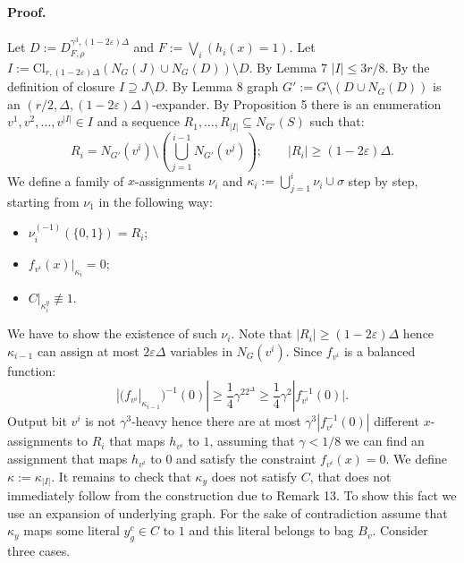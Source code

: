 \paragraph{Proof.} Let $D:=D_{F,\rho}^{\gamma^3,(1-2\varepsilon)\Delta}$ and $F:=\bigvee_i(h_i(x)=1)$. Let $I:=\mathrm{Cl}_{r,(1-2\varepsilon)\Delta}(N_G(J)\cup N_G(D))\setminus D$. By Lemma 7 $|I|\leq3r/8$. By the definition of closure $I\supseteq J\setminus D$.
By Lemma 8 graph $G':=G\setminus(D\cup N_G(D))$ is an $(r/2,\Delta,(1-2\varepsilon)\Delta)$-expander. By Proposition 5 there is an enumeration $v^1,v^2,\ldots,v^{|I|}\in I$ and a sequence $R_1,\ldots,R_{|I|}\subseteq N_{G'}(S)$ such that:
\[R_i=N_{G'}(v^i)\setminus\left(\bigcup_{j=1}^{i-1}N_{G'}(v^j)\right);\qquad|R_i|\geq(1-2\varepsilon)\Delta.\]
We define a family of $x$-assignments $\nu_i$ and $\kappa_i:=\bigcup_{j=1}^i\nu_i\cup\sigma$ step by step, starting from $\nu_1$ in the following way:
\begin{itemize}
\item $\nu_i^{(-1)}(\{0,1\})=R_i$;
\item $f_{v^i}(x)|_{\kappa_i}=0$;
\item $C|_{\kappa_i^y}\not\equiv1$.
\end{itemize}
We have to show the existence of such $\nu_i$. Note that $|R_i|\geq(1-2\varepsilon)\Delta$ hence $\kappa_{i-1}$ can assign at most $2\varepsilon\Delta$ variables in $N_G(v^i)$. Since $f_{v^i}$ is a balanced function:
\[|(f_{v^i}|_{\kappa_{i-1}})^{-1}(0)|\geq\frac14\gamma^22^\Delta\geq\frac14\gamma^2|f_{v^i}^{-1}(0)|.\]
Output bit $v^i$ is not $\gamma^3$-heavy hence there are at most $\gamma^3|f_{v^i}^{-1}(0)|$ different $x$-assignments to $R_i$ that maps $h_{v^i}$ to $1$, assuming that $\gamma<1/8$ we can find an assignment that maps $h_{v^i}$ to $0$ and satisfy the constraint $f_{v^i}(x)=0$. We define $\kappa:=\kappa_{|I|}$.
It remains to check that $\kappa_y$ does not satisfy $C$, that does not immediately follow from the construction due to Remark 13. To show this fact we use an expansion of underlying graph. For the sake of contradiction assume that $\kappa_y$ maps some literal $y_g^c\in C$ to $1$ and this literal belongs to bag $B_v$. Consider three cases.

